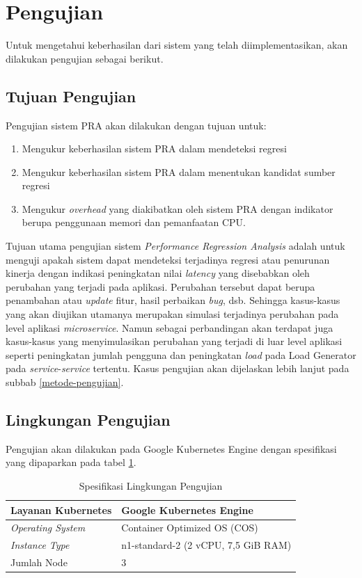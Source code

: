 \section{Pengujian}
Untuk mengetahui keberhasilan dari sistem yang telah diimplementasikan, akan dilakukan pengujian sebagai berikut.
\subsection{Tujuan Pengujian}
Pengujian sistem PRA akan dilakukan dengan tujuan untuk:
\begin{enumerate}
	\item Mengukur keberhasilan sistem PRA dalam mendeteksi regresi
	\item Mengukur keberhasilan sistem PRA dalam menentukan kandidat sumber regresi
	\item Mengukur \textit{overhead} yang diakibatkan oleh sistem PRA dengan
	indikator berupa penggunaan memori dan pemanfaatan CPU.
\end{enumerate}

Tujuan utama pengujian sistem \textit{Performance Regression Analysis} adalah untuk menguji apakah sistem dapat mendeteksi terjadinya regresi atau penurunan kinerja dengan indikasi peningkatan nilai \textit{latency} yang disebabkan oleh perubahan yang terjadi pada aplikasi. Perubahan tersebut dapat berupa penambahan atau \textit{update} fitur, hasil perbaikan \textit{bug}, dsb. Sehingga kasus-kasus yang akan diujikan utamanya merupakan simulasi terjadinya perubahan pada level aplikasi \textit{microservice}. Namun sebagai perbandingan akan terdapat juga kasus-kasus yang menyimulasikan perubahan yang terjadi di luar level aplikasi seperti peningkatan jumlah pengguna dan peningkatan \textit{load} pada Load Generator pada \textit{service}-\textit{service} tertentu. Kasus pengujian akan dijelaskan lebih lanjut pada subbab \ref{metode-pengujian}.

\subsection{Lingkungan Pengujian}
Pengujian akan dilakukan pada Google Kubernetes Engine dengan spesifikasi yang dipaparkan pada tabel \ref{testing-env}.
\begin{small}
	\begin{longtable}{ | p{5cm} | p{8cm} | }
		\caption{Spesifikasi Lingkungan Pengujian}
		\label{testing-env}                                                           
		\\ \hline
		\centering\bfseries{Layanan Kubernetes} & \centering\bfseries{Google Kubernetes Engine} \tabularnewline \hline
		\endfirsthead
		\textit{Operating System} & Container Optimized OS (COS) \\ \hline
		\textit{Instance Type} & n1-standard-2 (2 vCPU,  7,5 GiB RAM) \\ \hline
		Jumlah Node & 3 \\ \hline
		
	\end{longtable}
\end{small}

